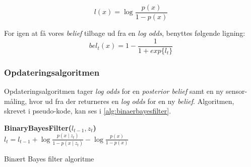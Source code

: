 \begin{equation}
l(x) = \log \frac{p(x)}{1 - p(x)}
\end{equation}

For igen at få vores \textit{belief} tilbage ud fra en \textit{log odds}, benyttes følgende ligning:
\begin{equation}
bel_t(x) = 1 - \frac{1}{1 + exp\{l_t\}}
\end{equation}

\subsubsection{Opdateringsalgoritmen}
Opdateringsalgoritmen tager \textit{log odds} for en \textit{posterior belief} samt en ny sensor-måling, hvor ud fra der returneres en \textit{log odds} for en ny \textit{belief}.
Algoritmen, skrevet i pseudo-kode, kan ses i \cref{alg:binaerbayesfilter}.

\begin{algorithm}[h]
\textbf{BinaryBayesFilter($l_{t-1}, z_t$)} \\
\Indp $l_t = l_{t-1} + \log \frac{p(x \mid z_t)}{1-p(x \mid z_t)} - \log \frac{p(x)}{1-p(x)}$ \\
\caption{Binært Bayes filter algoritme}
\label{alg:binaerbayesfilter}
\end{algorithm}
